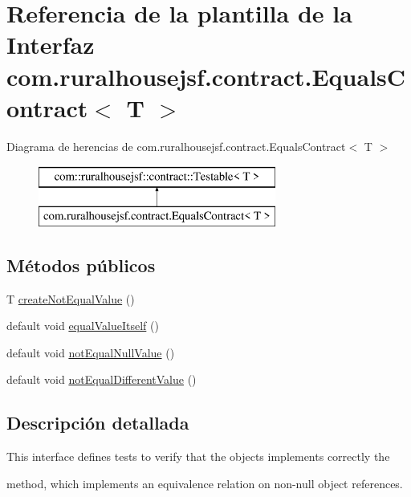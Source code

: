 \hypertarget{interfacecom_1_1ruralhousejsf_1_1contract_1_1_equals_contract}{}\section{Referencia de la plantilla de la Interfaz com.\+ruralhousejsf.\+contract.\+Equals\+Contract$<$ T $>$}
\label{interfacecom_1_1ruralhousejsf_1_1contract_1_1_equals_contract}
Diagrama de herencias de com.\+ruralhousejsf.\+contract.\+Equals\+Contract$<$ T $>$\begin{figure}[H]
\begin{center}
\leavevmode
\includegraphics[height=2.000000cm]{interfacecom_1_1ruralhousejsf_1_1contract_1_1_equals_contract}
\end{center}
\end{figure}
\subsection*{Métodos públicos}
\begin{DoxyCompactItemize}
\item 
T \mbox{\hyperlink{interfacecom_1_1ruralhousejsf_1_1contract_1_1_equals_contract_a65840509b57f6b89e42e2abf1978aa01}{create\+Not\+Equal\+Value}} ()
\item 
default void \mbox{\hyperlink{interfacecom_1_1ruralhousejsf_1_1contract_1_1_equals_contract_a5daf9e73e1147c8765c0fcf3d3dddbb0}{equal\+Value\+Itself}} ()
\item 
default void \mbox{\hyperlink{interfacecom_1_1ruralhousejsf_1_1contract_1_1_equals_contract_adda6a50dc1babeb3783fd92a09aac788}{not\+Equal\+Null\+Value}} ()
\item 
default void \mbox{\hyperlink{interfacecom_1_1ruralhousejsf_1_1contract_1_1_equals_contract_acaa5c1c071bf63a3e629977c73131fc8}{not\+Equal\+Different\+Value}} ()
\end{DoxyCompactItemize}


\subsection{Descripción detallada}
This interface defines tests to verify that the objects implements correctly the
\begin{DoxyCode}{0}
\end{DoxyCode}
 method, which implements an equivalence relation on non-\/null object references. 

